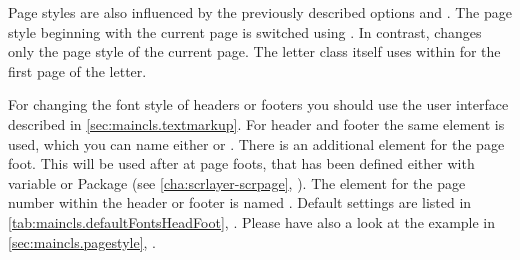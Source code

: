 Page styles are also influenced by the previously described
options
 and
. The page style beginning with
the current page is switched using . In contrast,
 changes only the page style of the current
page. The letter class itself uses
 within
 for the first page of the letter.

%
%
%
%
For changing the font style of headers or footers you should use the user
interface described in \autoref{sec:maincls.textmarkup}.  For header and
footer the same element is used, which you can name either
 or
.  There is an
additional element 
for the page foot. This will be used after  at page
foots, that has been defined either with variable
 or Package
 (see
\autoref{cha:scrlayer-scrpage},
). The element for the
page number within the header or footer is named
. Default settings
are listed in \autoref{tab:maincls.defaultFontsHeadFoot},
.  Please have also a look at
the example in \autoref{sec:maincls.pagestyle},
.
%
%
%
%
%
%
%
%
%
%
%
%


